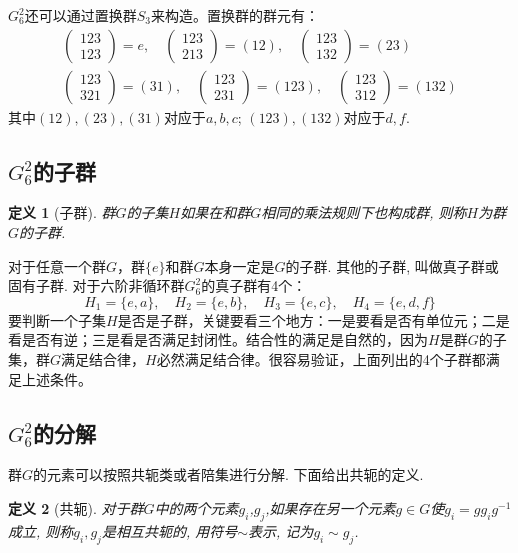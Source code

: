 \documentclass[UTF8]{ctexart}
\newtheorem{define}{定义}
\begin{document}
$G_6^2$还可以通过置换群$S_3$来构造。置换群的群元有：
\begin{gather}
\begin{pmatrix}
123 \\
123
\end{pmatrix} = e, \quad
\begin{pmatrix}
123 \\
213
\end{pmatrix} = (12), \quad
\begin{pmatrix}
123 \\
132
\end{pmatrix} = (23) \\
\begin{pmatrix}
123 \\
321
\end{pmatrix} = (31), \quad
\begin{pmatrix}
123 \\
231
\end{pmatrix} = (123), \quad
\begin{pmatrix}
123 \\
312
\end{pmatrix} = (132)
\end{gather}
其中$(12),(23),(31)$对应于$a,b,c$; $(123),(132)$对应于$d,f$.

\subsection{$G_6^2$的子群}
\begin{define}[子群]
群$G$的子集$H$如果在和群$G$相同的乘法规则下也构成群, 则称$H$为群$G$的子群.
\end{define}

对于任意一个群$G$，群$\{e\}$和群$G$本身一定是$G$的子群. 其他的子群, 叫做真子群或固有子群. 对于六阶非循环群$G_6^2$的真子群有4个：
\begin{equation}
H_1 = \{e,a\}, \quad H_2 = \{e,b\}, \quad H_3 = \{e,c\}, \quad H_4 = \{e,d,f\}
\end{equation}
要判断一个子集$H$是否是子群，关键要看三个地方：一是要看是否有单位元；二是看是否有逆；三是看是否满足封闭性。结合性的满足是自然的，因为$H$是群$G$的子集，群$G$满足结合律，$H$必然满足结合律。很容易验证，上面列出的4个子群都满足上述条件。
\subsection{$G_6^2$的分解}
群$G$的元素可以按照共轭类或者陪集进行分解. 下面给出共轭的定义.
\begin{define}[共轭]
对于群$G$中的两个元素$g_i$,$g_j$,如果存在另一个元素$g\in G$使$g_i = g g_i g^{-1}$成立, 则称$g_i,g_j$是相互共轭的, 用符号$\sim$表示, 记为$g_i \sim g_j$.
\end{define}
\end{document}
